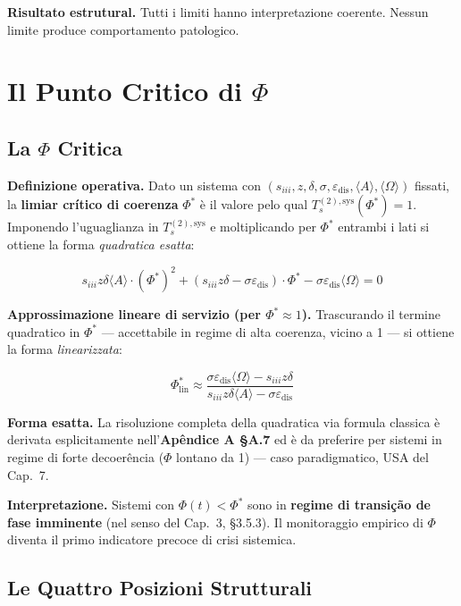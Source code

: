 \Proved{} \textbf{Risultato estrutural.} Tutti i limiti hanno
interpretazione coerente. Nessun limite produce comportamento
patologico.



\section{Il Punto Critico di $\Phi$}\label{il-punto-critico-di-ux3c6}

\subsection{La $\Phi$ Critica}\label{la-ux3c6-critica}

\Hypoth{} \textbf{Definizione operativa.} Dato un sistema con
\((s_{iii}, z, \delta, \sigma, \varepsilon_{\text{dis}}, \langle A\rangle, \langle\Omega\rangle)\)
fissati, la \textbf{limiar crítico di coerenza} \(\Phi^*\) è il valore
pelo qual \(T_s^{(2),\text{sys}}(\Phi^*) = 1\). Imponendo l'uguaglianza in
\(T_s^{(2),\text{sys}}\) e moltiplicando per \(\Phi^*\) entrambi i lati
si ottiene la forma \emph{quadratica esatta}:

\[
s_{iii} z \delta \langle A\rangle \cdot (\Phi^*)^2 + (s_{iii} z \delta - \sigma \varepsilon_{\text{dis}}) \cdot \Phi^* - \sigma \varepsilon_{\text{dis}} \langle\Omega\rangle = 0
\]

\Hypoth{} \textbf{Approssimazione lineare di servizio (per
\(\Phi^* \approx 1\)).} Trascurando il termine quadratico in \(\Phi^*\)
--- accettabile in regime di alta coerenza, vicino a 1 --- si ottiene la
forma \emph{linearizzata}:

\[
\Phi^*_{\text{lin}} \approx \frac{\sigma \varepsilon_{\text{dis}} \langle\Omega\rangle - s_{iii} z \delta}{s_{iii} z \delta \langle A\rangle - \sigma \varepsilon_{\text{dis}}}
\]

\Proved{} \textbf{Forma esatta.} La risoluzione completa della
quadratica via formula classica è derivata esplicitamente
nell'\textbf{Apêndice A \S{}A.7} ed è da preferire per sistemi in regime
di forte decoerência (\(\Phi\) lontano da 1) --- caso paradigmatico, USA
del Cap.~7.

\Hypoth{} \textbf{Interpretazione.} Sistemi con \(\Phi(t) < \Phi^*\)
sono in \textbf{regime di transição de fase imminente} (nel senso del
Cap.~3, \S{}3.5.3). Il monitoraggio empirico di \(\Phi\) diventa il primo
indicatore precoce di crisi sistemica.

\subsection{Le Quattro Posizioni
Strutturali}\label{le-quattro-posizioni-strutturali}

